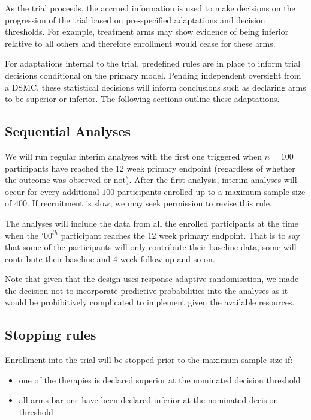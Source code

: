 \documentclass[
]{article}
\begin{document}
As the trial proceeds, the accrued information is used to make decisions on the progression of the trial based on pre-specified adaptations and decision thresholds.
For example, treatment arms may show evidence of being inferior relative to all others and therefore enrollment would cease for these arms.

For adaptations internal to the trial, predefined rules are in place to inform trial decisions conditional on the primary model.
Pending independent oversight from a DSMC, these statistical decisions will inform conclusions such as declaring arms to be superior or inferior.
The following sections outline these adaptations.

\hypertarget{sequential-analyses}{%
  \subsection{Sequential Analyses}\label{sequential-analyses}}

We will run regular interim analyses with the first one triggered when \(n=100\) participants have reached the 12 week primary endpoint (regardless of whether the outcome was observed or not).
After the first analysis, interim analyses will occur for every additional \(100\) participants enrolled up to a maximum sample size of \(400\).
If recruitment is slow, we may seek permission to revise this rule.

The analyses will include the data from all the enrolled participants at the time when the $'00^{th}$ participant reaches the 12 week primary endpoint.
That is to say that some of the participants will only contribute their baseline data, some will contribute their baseline and 4 week follow up and so on.

Note that given that the design uses response adaptive randomisation, we made the decision not to incorporate predictive probabilities into the analyses as it would be prohibitively complicated to implement given the available resources.

\hypertarget{stopping-rules}{%
  \subsection{Stopping rules}\label{stopping-rules}}

Enrollment into the trial will be stopped prior to the maximum sample size if:

\begin{itemize}
  \item one of the therapies is declared superior at the nominated decision threshold
  \item all arms bar one have been declared inferior at the nominated decision threshold
\end{itemize}
\end{document}
